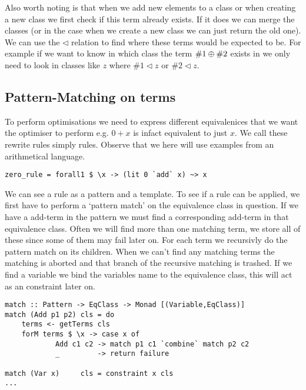 Also worth noting is that when we add new elements to a class or when creating
a new class we first check if this term already exists. If it does we can merge
the classes (or in the case when we create a new class we can just return the old
one). We can use the $\lhd$ relation to find where these terms would be expected
to be. %
For example if we want to know in which class the term $\#1 \oplus \#2$ exists in we only need to
look in classes like $z$ where $\#1 \lhd z$ or $\#2 \lhd z$.
\subsection{Pattern-Matching on terms}
To perform optimisations we need to express different equivalenices that we want the optimiser to perform e.g. $0 + x$ is infact equivalent to just $x$. We call these rewrite rules simply rules.
Observe that we here will use examples from an arithmetical language.

\begin{verbatim}
zero_rule = forall1 $ \x -> (lit 0 `add` x) ~> x
\end{verbatim}

We can see a rule as a pattern and a template. To see if a rule can be applied, we first have to perform a `pattern match' on the equivalence class in question. If we have a add-term in the pattern we must find a corresponding add-term in that equivalence class. Often we will find more than one matching term, we store all of these since some of them may fail later on. For each term we recursivly do the pattern match on its children. When we can't find any matching terms the matching is aborted and that branch of the recursive matching is trashed. If we find a variable we bind the variables name to the equivalence class, this will act as an constraint later on.

\begin{verbatim}
match :: Pattern -> EqClass -> Monad [(Variable,EqClass)]
match (Add p1 p2) cls = do 
    terms <- getTerms cls
    forM terms $ \x -> case x of
            Add c1 c2 -> match p1 c1 `combine` match p2 c2
            _         -> return failure
                                       
match (Var x)     cls = constraint x cls
...
\end{verbatim}

